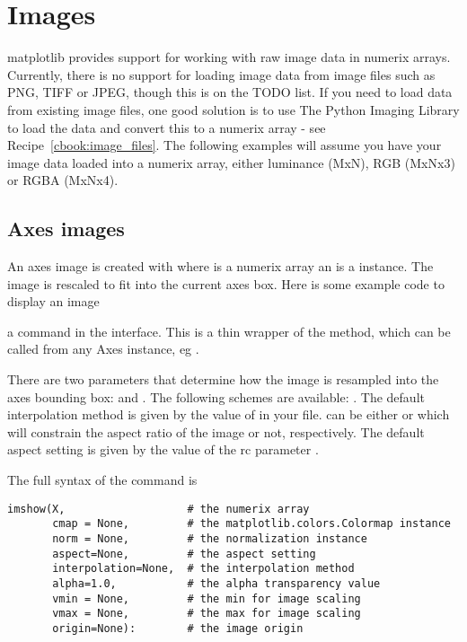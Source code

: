 \documentclass[]{book}
\begin{document}
\section{Images}
\label{sec:images}

matplotlib provides support for working with raw image data in numerix
arrays.  Currently, there is no support for loading image data from
image files such as PNG, TIFF or JPEG, though this is on the TODO
list.  If you need to load data from existing image files, one good
solution is to use The Python Imaging Library to load the data and
convert this to a numerix array - see Recipe~\ref{cbook:image_files}.
The following examples will assume you have your image data loaded
into a numerix array, either luminance (MxN), RGB (MxNx3) or RGBA
(MxNx4).

\subsection{Axes images}
\label{sec:image_axes}
An axes image is created with  where
 is a numerix array an  is a
 instance.  The image is rescaled to fit
into the current axes box.  Here is some example code to display an
image



\noindent {} a command in the 
interface.  This is a thin wrapper of the
 method, which can be called from any
Axes instance, eg .

There are two parameters that determine how the image is resampled
into the axes bounding box:  and .
The following  schemes are available:
.  The default
interpolation method is given by the value of 
in your  file.   can be either
 or  which will constrain the aspect ratio of
the image or not, respectively.  The default aspect setting is given
by the value of the rc parameter .

The full syntax of the  command is

\begin{lstlisting}
imshow(X,                   # the numerix array
       cmap = None,         # the matplotlib.colors.Colormap instance
       norm = None,         # the normalization instance
       aspect=None,         # the aspect setting
       interpolation=None,  # the interpolation method
       alpha=1.0,           # the alpha transparency value
       vmin = None,         # the min for image scaling 
       vmax = None,         # the max for image scaling
       origin=None):        # the image origin

\end{lstlisting}
\end{document}
